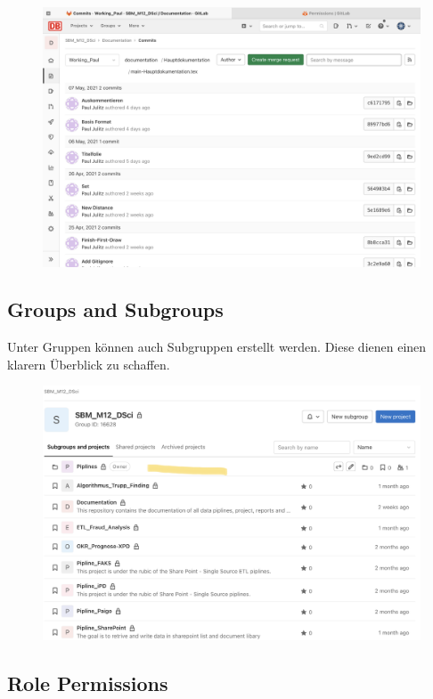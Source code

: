\begin{figure}[H]
	\centering
	\includegraphics[width=0.7\linewidth]{attachment/chapter_5/Scc010}
\end{figure}

\subsection{Groups and Subgroups}
Unter Gruppen können auch Subgruppen erstellt werden. Diese dienen einen klarern Überblick zu schaffen.

\begin{figure}[H]
	\centering
	\includegraphics[width=0.7\linewidth]{attachment/chapter_5/Scc012}
\end{figure}

\subsection{Role Permissions}

